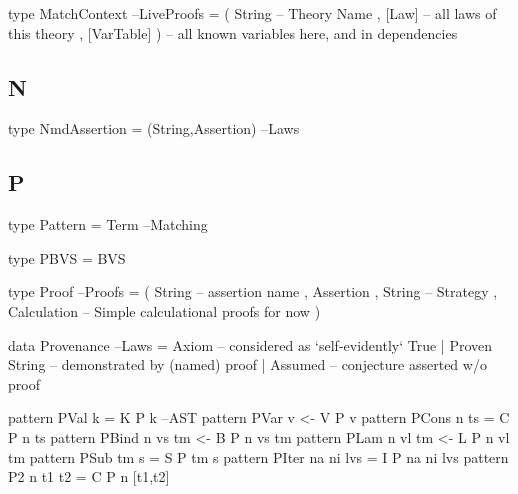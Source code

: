 \begin{code}
type MatchContext                                                 --LiveProofs
  = ( String       -- Theory Name
    , [Law]        -- all laws of this theory
    , [VarTable] ) -- all known variables here, and in dependencies
\end{code}

\subsection{N}

\begin{code}
type NmdAssertion = (String,Assertion)                                  --Laws
\end{code}

\subsection{P}

\begin{code}
type Pattern = Term                                                 --Matching
\end{code}

\begin{code}
type PBVS = BVS
\end{code}

\begin{code}
type Proof                                                            --Proofs
  = ( String -- assertion name
    , Assertion
    , String -- Strategy
    , Calculation -- Simple calculational proofs for now
    )
\end{code}

\begin{code}
data Provenance                                                         --Laws
  = Axiom          --  considered as `self-evidently` True
  | Proven String  --  demonstrated by (named) proof
  | Assumed        --  conjecture asserted w/o proof
\end{code}

\begin{code}
pattern PVal k             =  K P k                                      --AST
pattern PVar v            <-  V P v
pattern PCons n ts         =  C P n ts
pattern PBind n vs tm     <-  B P n vs tm
pattern PLam n vl tm      <-  L P n vl tm
pattern PSub tm s          =  S P tm s
pattern PIter na ni lvs    =  I P na ni lvs
pattern P2   n t1 t2       =  C P n [t1,t2]
\end{code}


